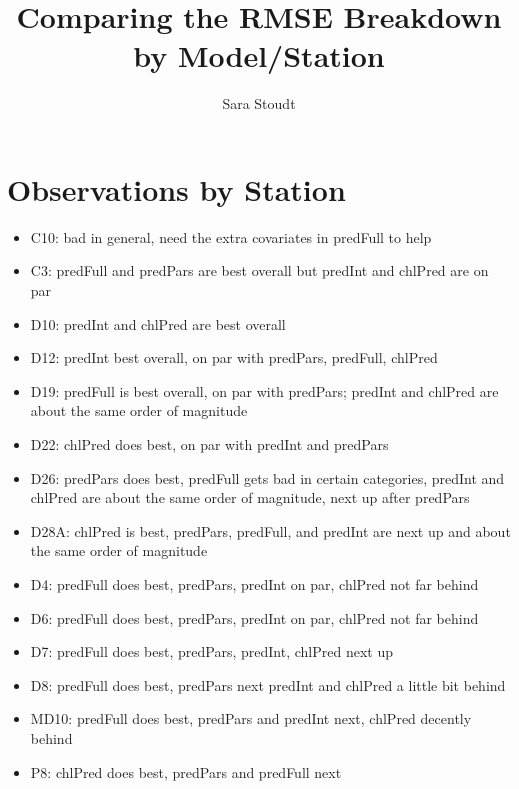 \documentclass[12pt]{amsart}
\title{Comparing the RMSE Breakdown by Model/Station}
\author{Sara Stoudt}
\date{} %
\begin{document}
\maketitle



\section{Observations by Station}

\begin{itemize}

\item C10: bad in general, need the extra covariates in predFull to help
\item C3: predFull and predPars are best overall but predInt and chlPred are on par
\item D10: predInt and chlPred are best overall
\item D12: predInt best overall, on par with predPars, predFull, chlPred
\item D19: predFull is best overall, on par with predPars; predInt and chlPred are about the same order of magnitude
\item D22: chlPred does best, on par with predInt and predPars
\item D26: predPars does best, predFull gets bad in certain categories, predInt and chlPred are about the same order of magnitude, next up after predPars
\item D28A: chlPred is best, predPars, predFull, and predInt are next up and about the same order of magnitude
\item D4: predFull does best, predPars, predInt on par, chlPred not far behind
\item D6: predFull does best, predPars, predInt on par, chlPred not far behind
\item D7: predFull does best, predPars, predInt, chlPred next up
\item D8: predFull does best, predPars next predInt and chlPred a little bit behind
\item MD10: predFull does best, predPars and predInt next, chlPred decently behind
\item P8: chlPred does best, predPars and predFull next
\end{itemize}



\end{document}
